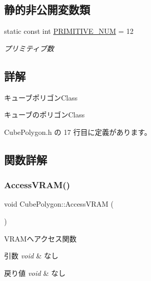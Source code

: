 \subsection*{静的非公開変数類}
\begin{DoxyCompactItemize}
\item 
static const int \mbox{\hyperlink{class_cube_polygon_a9d08fbf2d854fdbf0232750573f3aeee}{P\+R\+I\+M\+I\+T\+I\+V\+E\+\_\+\+N\+UM}} = 12
\begin{DoxyCompactList}\small\item\em プリミティブ数 \end{DoxyCompactList}\end{DoxyCompactItemize}


\subsection{詳解}
キューブポリゴン\+Class 

キューブのポリゴン\+Class 

 Cube\+Polygon.\+h の 17 行目に定義があります。



\subsection{関数詳解}
\mbox{\label{class_cube_polygon_a715db255bf7ebd3c3aec2095d73b9399}} 
\subsubsection{\texorpdfstring{Access\+V\+R\+A\+M()}{AccessVRAM()}}
{\footnotesize\ttfamily void Cube\+Polygon\+::\+Access\+V\+R\+AM (\begin{DoxyParamCaption}{ }\end{DoxyParamCaption})\hspace{0.3cm}{\ttfamily [private]}}



V\+R\+A\+Mへアクセス関数 


\begin{DoxyParams}{引数}
{\em void} & なし \\
\hline
\end{DoxyParams}

\begin{DoxyRetVals}{戻り値}
{\em void} & なし \\
\hline
\end{DoxyRetVals}


